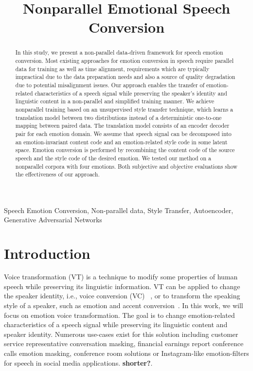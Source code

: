 \documentclass{article}
\title{Nonparallel Emotional Speech Conversion}
\begin{document}
%
\maketitle
%
\begin{abstract}
{\color{blue}In this study, we present a non-parallel data-driven framework for speech emotion conversion. Most existing approaches for emotion conversion in speech require parallel data for training as well as time alignment, requirements which are typically impractical due to the data preparation needs and also a source of quality degradation due to potential misalignment issues. Our approach enables the transfer of emotion-related characteristics of a speech signal while preserving the speaker's identity and linguistic content in a non-parallel and simplified training manner. We achieve nonparallel training based on an unsupervised style transfer technique, which learns a translation model between two distributions instead of a deterministic one-to-one mapping between paired data. The translation model consists of an encoder decoder pair for each emotion domain. We assume that speech signal can be decomposed into an emotion-invariant content code and an emotion-related style code in some latent space. Emotion conversion is performed by recombining the content code of the source speech and the style code of the desired emotion. We tested our method on a nonparallel corpora with four emotions. Both subjective and objective evaluations show the effectiveness of our approach.}
\end{abstract}

%
\begin{keywords}
Speech Emotion Conversion, Non-parallel data, Style Transfer, Autoencoder, Generative Adversarial Networks
\end{keywords}
%



\section{Introduction}
\label{sec:intro}
Voice transformation (VT) is a technique to modify some properties of human speech while preserving its linguistic information. VT can be applied to change the speaker identity, i.e., voice conversion (VC) ~\cite{mohammadi2017overview}, or to transform the speaking style of a speaker, such as emotion and accent conversion~\cite{zhao2018accent}. In this work, we will focus on emotion voice transformation. The goal is to change emotion-related characteristics of a speech signal while preserving its linguistic content and speaker identity. {\color{blue}Numerous use-cases exist for this solution including customer service representative conversation masking, financial earnings report conference calls emotion masking, conference room solutions or Instagram-like emotion-filters for speech in social media applications. \textbf{shorter?}}.
\end{document}
